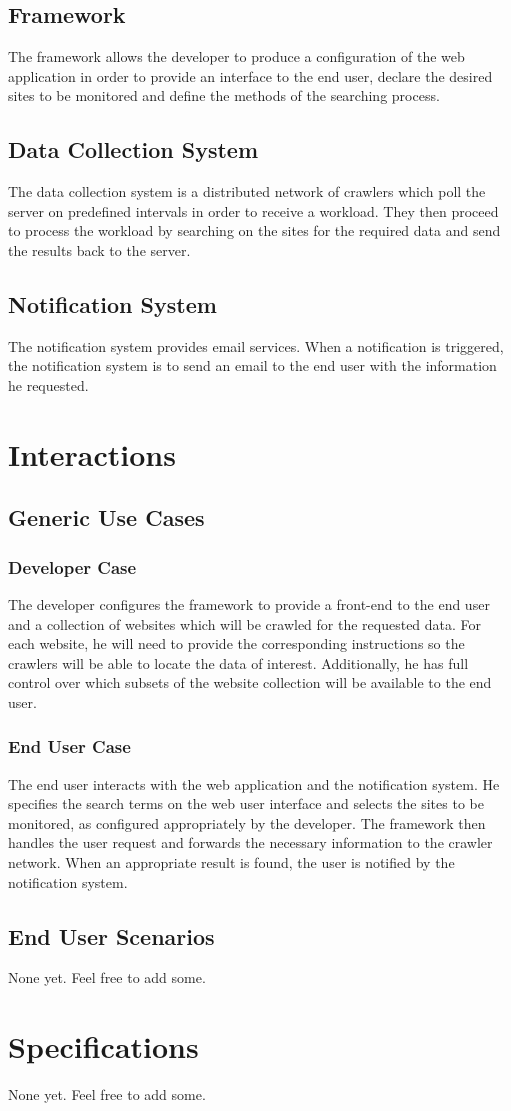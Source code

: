 \documentclass[a4paper,10pt]{article} \usepackage{anysize}
\begin{document}
    \subsection{Framework}
        The framework allows the developer to produce a configuration of the
        web application in order to provide an interface to the end user,
        declare the desired sites to be monitored and define the methods of
        the searching process.
    \subsection{Data Collection System}
        The data collection system is a distributed network of crawlers which
        poll the server on predefined intervals in order to receive a
        workload. They then proceed to process the workload by searching on
        the sites for the required data and send the results back to the
        server.
    \subsection{Notification System}
        The notification system provides email services. When a notification
        is triggered, the notification system is to send an email to the end
        user with the information he requested.
\section{Interactions}
    \subsection{Generic Use Cases}
        \subsubsection{Developer Case}
            The developer configures the framework to provide a front-end to
            the end user and a collection of websites which will be crawled
            for the requested data. For each website, he will need to provide
            the corresponding instructions so the crawlers will be able to
            locate the data of interest. Additionally, he has full control
            over which subsets of the website collection will be available to
            the end user.
        \subsubsection{End User Case}
            The end user interacts with the web application and the
            notification system. He specifies the search terms on the web user
            interface and selects the sites to be monitored, as configured
            appropriately by the developer. The framework then handles the
            user request and forwards the necessary information to the crawler
            network. When an appropriate result is found, the user is notified
            by the notification system.

    \subsection{End User Scenarios}
        None yet. Feel free to add some.

\section{Specifications}
    None yet. Feel free to add some.
\end{document}
